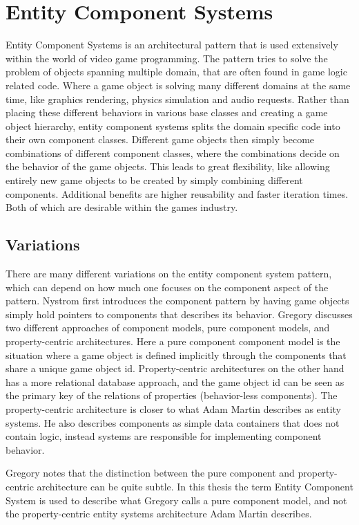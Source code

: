 \section{Entity Component Systems}
Entity Component Systems is an architectural pattern that is used extensively within the world of video game programming.
The pattern tries to solve the problem of objects spanning multiple domain, that are often found in game logic related code.
Where a game object is solving many different domains at the same time, like graphics rendering, physics simulation and
audio requests.
Rather than placing these different behaviors in various base classes and creating a game object hierarchy,
entity component systems splits the domain specific code into their own component classes.
Different game objects then simply become combinations of different component classes,
where the combinations decide on the behavior of the game objects.
This leads to great flexibility, like allowing entirely new game objects to be created by simply combining different components.
Additional benefits are higher reusability and faster iteration times.
Both of which are desirable within the games industry\cite{game_programming_patterns}.

\subsection{Variations}
There are many different variations on the entity component system pattern, which can depend on how much one focuses on
the component aspect of the pattern.
Nystrom\cite[component]{game_programming_patterns} first introduces the component pattern by having game objects simply hold
pointers to components that describes its behavior.
Gregory\cite[p. 886]{game_engine_architecture} discusses two different approaches of component models, pure component models,
and property-centric architectures. Here a pure component component model is the situation where a game object is defined
implicitly through the components that share a unique game object id.
Property-centric architectures on the other hand has a more relational database approach, and the game object id can be seen
as the primary key of the relations of properties (behavior-less components).
The property-centric architecture is closer to what Adam Martin\cite{t_machine_entity_systems} describes as entity systems.
He also describes components as simple data containers that does not contain logic,
instead systems are responsible for implementing component behavior.

Gregory\cite[p. 890]{game_engine_architecture} notes that the distinction between the pure component and property-centric
architecture can be quite subtle. 
In this thesis the term Entity Component System is used to describe what Gregory calls a pure component model,
and not the property-centric entity systems architecture Adam Martin describes.
